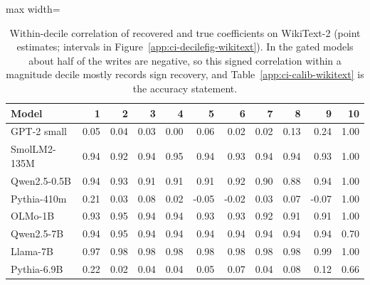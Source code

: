 \begin{table}[H]\centering\scriptsize
\caption{Within-decile correlation of recovered and true coefficients on WikiText-2 (point estimates; intervals in Figure~\ref{app:ci-decilefig-wikitext}). In the gated models about half of the writes are negative, so this signed correlation within a magnitude decile mostly records sign recovery, and Table~\ref{app:ci-calib-wikitext} is the accuracy statement.}\label{app:ci-deciles-wikitext}
\begin{adjustbox}{max width=\linewidth}
\begin{tabular}{lrrrrrrrrrr}\toprule
Model & 1 & 2 & 3 & 4 & 5 & 6 & 7 & 8 & 9 & 10 \\ \midrule
GPT-2 small & 0.05 & 0.04 & 0.03 & 0.00 & 0.06 & 0.02 & 0.02 & 0.13 & 0.24 & 1.00 \\
SmolLM2-135M & 0.94 & 0.92 & 0.94 & 0.95 & 0.94 & 0.93 & 0.94 & 0.94 & 0.93 & 1.00 \\
Qwen2.5-0.5B & 0.94 & 0.93 & 0.91 & 0.91 & 0.91 & 0.92 & 0.90 & 0.88 & 0.94 & 1.00 \\
Pythia-410m & 0.21 & 0.03 & 0.08 & 0.02 & -0.05 & -0.02 & 0.03 & 0.07 & -0.07 & 1.00 \\
OLMo-1B & 0.93 & 0.95 & 0.94 & 0.94 & 0.93 & 0.93 & 0.92 & 0.91 & 0.91 & 1.00 \\
Qwen2.5-7B & 0.94 & 0.95 & 0.94 & 0.94 & 0.94 & 0.94 & 0.94 & 0.94 & 0.94 & 0.70 \\
Llama-7B & 0.97 & 0.98 & 0.98 & 0.98 & 0.98 & 0.98 & 0.98 & 0.98 & 0.99 & 1.00 \\
Pythia-6.9B & 0.22 & 0.02 & 0.04 & 0.04 & 0.05 & 0.07 & 0.04 & 0.08 & 0.12 & 0.66 \\
\bottomrule\end{tabular}\end{adjustbox}
\end{table}
